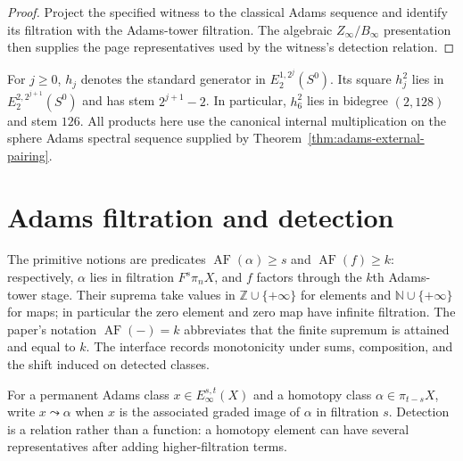 \begin{proof}
  Project the specified witness to the classical Adams sequence and identify
  its filtration with the Adams-tower filtration.  The algebraic
  $Z_\infty/B_\infty$ presentation then supplies the page representatives used
  by the witness's detection relation.
\end{proof}

\begin{definition}
  \label{def:adams-hj}
  \notready
  For $j\ge0$, $h_j$ denotes the standard generator in
  $E_2^{1,2^j}(S^0)$.  Its square $h_j^2$ lies in
  $E_2^{2,2^{j+1}}(S^0)$ and has stem $2^{j+1}-2$.  In particular,
  $h_6^2$ lies in bidegree $(2,128)$ and stem $126$.  All products here use
  the canonical internal multiplication on the sphere Adams spectral sequence
  supplied by Theorem~\ref{thm:adams-external-pairing}.
\end{definition}

\section{Adams filtration and detection}

\begin{definition}
  \label{def:adams-filtration}
  \notready
  The primitive notions are predicates $\operatorname{AF}(\alpha)\ge s$ and
  $\operatorname{AF}(f)\ge k$: respectively, $\alpha$ lies in filtration
  $F^s\pi_nX$, and $f$ factors through the $k$th Adams-tower stage.  Their
  suprema take values in $\mathbb Z\cup\{+\infty\}$ for elements and
  $\mathbb N\cup\{+\infty\}$ for maps; in particular the zero element and zero
  map have infinite filtration.  The paper's notation
  $\operatorname{AF}(-)=k$ abbreviates that the finite supremum is attained
  and equal to $k$.  The interface records monotonicity under sums,
  composition, and the shift induced on detected classes.
\end{definition}

\begin{definition}
  \label{def:adams-detection}
  \notready
  For a permanent Adams class $x\in E_\infty^{s,t}(X)$ and a homotopy class
  $\alpha\in\pi_{t-s}X$, write $x\leadsto\alpha$ when $x$ is the associated
  graded image of $\alpha$ in filtration $s$.  Detection is a relation rather
  than a function: a homotopy element can have several representatives after
  adding higher-filtration terms.
\end{definition}
